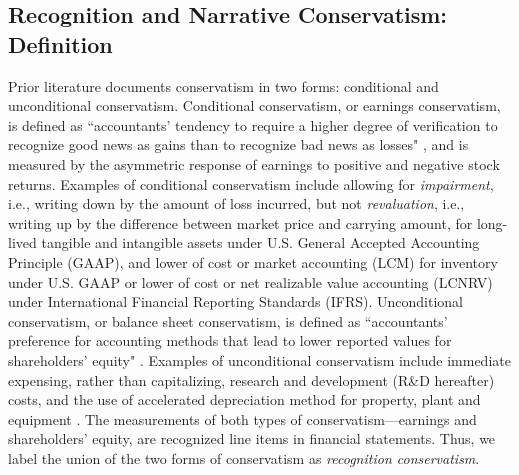 \documentclass[a4paper]{article}
\begin{document}
\begin{spacing}{2}
\subsection{Recognition and Narrative Conservatism: Definition}

Prior literature documents conservatism in two forms: conditional and unconditional conservatism. Conditional conservatism, or earnings conservatism, is defined as ``accountants' tendency to require a higher degree of verification to recognize good news as gains than to recognize bad news as losses" \citep*[p. 7]{basuConservatismPrincipleAsymmetric1997}, and is measured by the asymmetric response of earnings to positive and negative stock returns. Examples of conditional conservatism include allowing for \textit{impairment}, i.e., writing down by the amount of loss incurred, but not \textit{revaluation}, i.e., writing up by the difference between market price and carrying amount, for long-lived tangible and intangible assets under U.S. General Accepted Accounting Principle (GAAP), and lower of cost or market accounting (LCM) for inventory under U.S. GAAP or lower of cost or net realizable value accounting (LCNRV) under International Financial Reporting Standards (IFRS). Unconditional conservatism, or balance sheet conservatism, is defined as ``accountants' preference for accounting methods that lead to lower reported values for shareholders' equity" \citep*[p. 8]{basuConservatismPrincipleAsymmetric1997}. Examples of unconditional conservatism include immediate expensing, rather than capitalizing, research and development (R\&D hereafter) costs, and the use of accelerated depreciation method for property, plant and equipment \citep*{beaverConditionalUnconditionalConservatism2005}. The measurements of both types of conservatism---earnings and shareholders' equity, are recognized line items in financial statements. Thus, we label the union of the two forms of conservatism as \textit{recognition conservatism}. 


\end{spacing}
\end{document}

